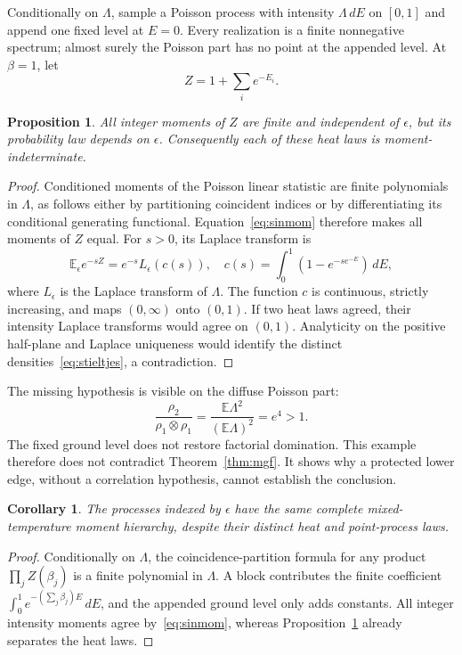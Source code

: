 \documentclass[11pt,a4paper]{article}
\newtheorem{proposition}[theorem]{Proposition}
\newtheorem{corollary}[theorem]{Corollary}
\theoremstyle{remark}\newtheorem{remark}[theorem]{Remark}
\newcommand{\E}{\mathbb E}
\begin{document}
Conditionally on $\Lambda$, sample a Poisson process with intensity $\Lambda\,dE$ on $[0,1]$ and append one fixed level at $E=0$.
Every realization is a finite nonnegative spectrum; almost surely the Poisson part has no point at the appended level.
At $\beta=1$, let
\begin{equation}
 Z=1+\sum_i e^{-E_i}.
\end{equation}
\begin{proposition}\label{prop:cox}
All integer moments of $Z$ are finite and independent of $\epsilon$, but its probability law depends on $\epsilon$.
Consequently each of these heat laws is moment-indeterminate.
\end{proposition}
\begin{proof}
Conditioned moments of the Poisson linear statistic are finite polynomials in $\Lambda$, as follows either by partitioning coincident indices or by differentiating its conditional generating functional.
Equation~\eqref{eq:sinmom} therefore makes all moments of $Z$ equal.
For $s>0$, its Laplace transform is
\begin{equation}\label{eq:coxlap}
 \E_\epsilon e^{-sZ}=e^{-s}L_\epsilon(c(s)),\quad
 c(s)=\int_0^1(1-e^{-s e^{-E}})\,dE,
\end{equation}
where $L_\epsilon$ is the Laplace transform of $\Lambda$.
The function $c$ is continuous, strictly increasing, and maps $(0,\infty)$ onto $(0,1)$.
If two heat laws agreed, their intensity Laplace transforms would agree on $(0,1)$.
Analyticity on the positive half-plane and Laplace uniqueness would identify the distinct densities~\eqref{eq:stieltjes}, a contradiction.
\end{proof}

The missing hypothesis is visible on the diffuse Poisson part:
\begin{equation}
 \frac{\rho_2}{\rho_1\otimes\rho_1}
 =\frac{\E\Lambda^2}{(\E\Lambda)^2}=e^4>1.
\end{equation}
The fixed ground level does not restore factorial domination.
This example therefore does not contradict Theorem~\ref{thm:mgf}.
It shows why a protected lower edge, without a correlation hypothesis, cannot establish the conclusion.

\begin{corollary}\label{cor:coxjoint}
The processes indexed by $\epsilon$ have the same complete mixed-temperature moment hierarchy, despite their distinct heat and point-process laws.
\end{corollary}
\begin{proof}
Conditionally on $\Lambda$, the coincidence-partition formula for any product $\prod_j Z(\beta_j)$ is a finite polynomial in $\Lambda$.
A block contributes the finite coefficient $\int_0^1e^{-(\sum_j\beta_j)E}\,dE$, and the appended ground level only adds constants.
All integer intensity moments agree by~\eqref{eq:sinmom}, whereas Proposition~\ref{prop:cox} already separates the heat laws.
\end{proof}
\end{document}
